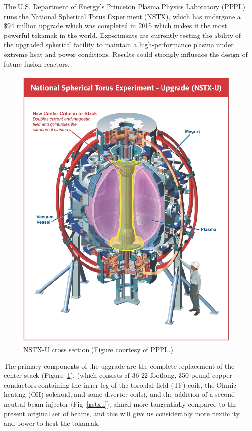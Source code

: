\documentclass[12pt,lot, lof]{puthesis}
\begin{document}
The U.S. Department of Energy's Princeton Plasma Physics Laboratory (PPPL) runs the National Spherical Torus Experiment (NSTX), which has undergone a \$94 million upgrade which was completed in 2015 which makes it the most powerful tokamak in the world. Experiments are currently testing the ability of the upgraded spherical facility to maintain a high-performance plasma under extreme heat and power conditions. Results could strongly influence the design of future fusion reactors.

\begin{figure}
\centering
\includegraphics[width= 0.85\linewidth]{nstx3}
\caption{NSTX-U cross section (Figure courtesy of PPPL.)}
\label{nstx3}
\end{figure}

The primary components of the upgrade are the complete replacement of the center stack (Figure~\ref{nstx3}), (which consists of 36 22-footlong, 350-pound copper conductors containing the inner-leg of the toroidal field (TF) coils, the Ohmic heating (OH) solenoid, and some divertor coils), and the addition of a second neutral beam injector (Fig~\ref{nstxu}), aimed more tangentially compared to the present original set of beams, and this will give us considerably more flexibility and power to heat the tokamak.
\end{document}

